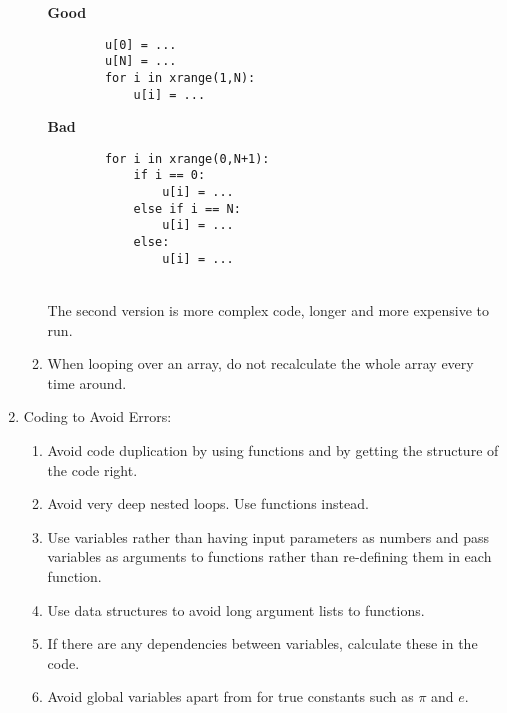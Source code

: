 \begin{enumerate}
\begin{enumerate}
     {\bf Good \hspace{-0.05\linewidth}}
    \begin{minipage}[t]{0.45\linewidth}\vspace{-10pt}
        \begin{lstlisting}
        u[0] = ...
        u[N] = ...
        for i in xrange(1,N):
            u[i] = ...
        \end{lstlisting}
    \end{minipage}
    {\bf Bad \hspace{-0.05\linewidth}}
    \begin{minipage}[t]{0.3\linewidth}\vspace{-10pt}
        \begin{lstlisting}
        for i in xrange(0,N+1):
            if i == 0:
                u[i] = ...
            else if i == N:
                u[i] = ...
            else:
                u[i] = ...
        \end{lstlisting}
    \end{minipage} \vspace{-12pt} \\
The second version is more complex code, longer and more expensive to run.
    \item When looping over an array, do not recalculate the whole array every time around.
    \end{enumerate}

\item Coding to Avoid Errors:
    \begin{enumerate}
    \item Avoid code duplication by using functions and by getting the structure of the code right.

    \item Avoid very deep nested loops. Use functions instead.

    \item Use variables rather than having input parameters as numbers and pass variables as arguments to functions rather than re-defining them in each function.

    \item Use data structures to avoid long argument lists to functions.

    \item If there are any dependencies between variables, calculate these in the code.
    
    \item Avoid global variables apart from for true constants such as $\pi$ and $e$.
    \end{enumerate}


\end{enumerate}
